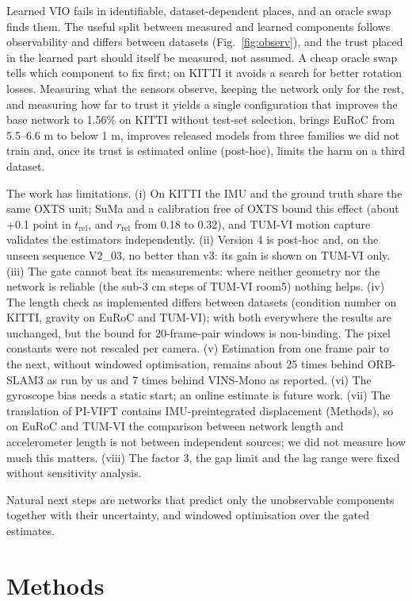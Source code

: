 \documentclass[pdflatex,sn-nature]{sn-jnl}
\begin{document}
Learned VIO fails in identifiable, dataset-dependent places, and an oracle swap finds them. The useful split between measured and learned components follows observability and differs between datasets (Fig.~\ref{fig:observ}), and the trust placed in the learned part should itself be measured, not assumed. A cheap oracle swap tells which component to fix first; on KITTI it avoids a search for better rotation losses. Measuring what the sensors observe, keeping the network only for the rest, and measuring how far to trust it yields a single configuration that improves the base network to 1.56\% on KITTI without test-set selection, brings EuRoC from 5.5--6.6 m to below 1 m, improves released models from three families we did not train and, once its trust is estimated online (post-hoc), limits the harm on a third dataset.

The work has limitations. (i) On KITTI the IMU and the ground truth share the same OXTS unit; SuMa and a calibration free of OXTS bound this effect (about +0.1 point in $t_\mathrm{rel}$, and $r_\mathrm{rel}$ from 0.18 to 0.32), and TUM-VI motion capture validates the estimators independently. (ii) Version 4 is post-hoc and, on the unseen sequence V2\_03, no better than v3: its gain is shown on TUM-VI only. (iii) The gate cannot beat its measurements: where neither geometry nor the network is reliable (the sub-3 cm steps of TUM-VI room5) nothing helps. (iv) The length check as implemented differs between datasets (condition number on KITTI, gravity on EuRoC and TUM-VI); with both everywhere the results are unchanged, but the bound for 20-frame-pair windows is non-binding. The pixel constants were not rescaled per camera. (v) Estimation from one frame pair to the next, without windowed optimisation, remains about 25 times behind ORB-SLAM3 as run by us and 7 times behind VINS-Mono as reported. (vi) The gyroscope bias needs a static start; an online estimate is future work. (vii) The translation of PI-VIFT contains IMU-preintegrated displacement (Methods), so on EuRoC and TUM-VI the comparison between network length and accelerometer length is not between independent sources; we did not measure how much this matters. (viii) The factor 3, the gap limit and the lag range were fixed without sensitivity analysis.

Natural next steps are networks that predict only the unobservable components together with their uncertainty, and windowed optimisation over the gated estimates.

\section{Methods}\label{sec:methods}
\end{document}

